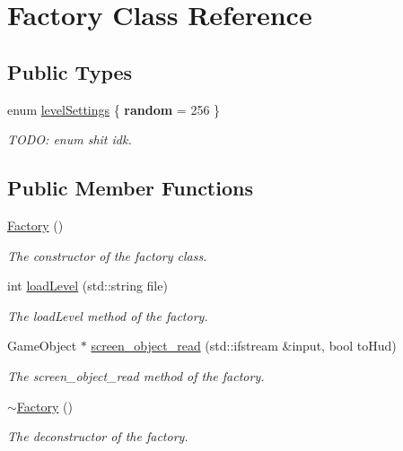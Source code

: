 \hypertarget{class_factory}{\section{Factory Class Reference}
\label{class_factory}
}
\subsection*{Public Types}
\begin{DoxyCompactItemize}
\item 
enum \hyperlink{class_factory_a31534970ff95c9cb57a4883cb8ef7b78}{level\-Settings} \{ {\bfseries random} = 256
 \}
\begin{DoxyCompactList}\small\item\em T\-O\-D\-O\-: enum shit idk. \end{DoxyCompactList}\end{DoxyCompactItemize}
\subsection*{Public Member Functions}
\begin{DoxyCompactItemize}
\item 
\hyperlink{class_factory_ac792bf88cfb7b6804b479529da5308cc}{Factory} ()
\begin{DoxyCompactList}\small\item\em The constructor of the factory class. \end{DoxyCompactList}\item 
int \hyperlink{class_factory_af0852710e037ab8ded28cc12ec1c099b}{load\-Level} (std\-::string file)
\begin{DoxyCompactList}\small\item\em The load\-Level method of the factory. \end{DoxyCompactList}\item 
Game\-Object $\ast$ \hyperlink{class_factory_ad7696889634790fcac45cfd18ae44039}{screen\-\_\-object\-\_\-read} (std\-::ifstream \&input, bool to\-Hud)
\begin{DoxyCompactList}\small\item\em The screen\-\_\-object\-\_\-read method of the factory. \end{DoxyCompactList}\item 
\hyperlink{class_factory_a8f71456f48e4df402c778a44191ff40e}{$\sim$\-Factory} ()
\begin{DoxyCompactList}\small\item\em The deconstructor of the factory. \end{DoxyCompactList}\end{DoxyCompactItemize}


